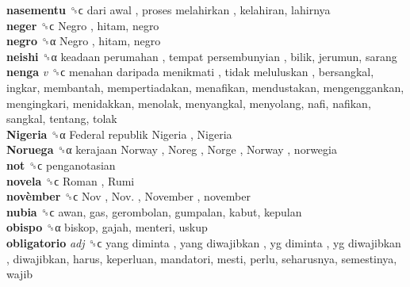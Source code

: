 \textbf{nasementu} ␝ϲ   dari awal ,  proses melahirkan , kelahiran, lahirnya  \\
\textbf{neger} ␝ϲ   Negro , hitam, negro  \\
\textbf{negro} ␝α   Negro , hitam, negro  \\
\textbf{neishi} ␝α   keadaan perumahan ,  tempat persembunyian , bilik, jerumun, sarang  \\
\textbf{nenga} \emph{v}  ␝ϲ   menahan daripada menikmati ,  tidak meluluskan , bersangkal, ingkar, membantah, mempertiadakan, menafikan, mendustakan, mengenggankan, mengingkari, menidakkan, menolak, menyangkal, menyolang, nafi, nafikan, sangkal, tentang, tolak  \\
\textbf{Nigeria} ␝α   Federal republik Nigeria ,  Nigeria   \\
\textbf{Noruega} ␝α   kerajaan Norway ,  Noreg ,  Norge ,  Norway , norwegia  \\
\textbf{not} ␝ϲ  penganotasian  \\
\textbf{novela} ␝ϲ   Roman ,  Rumi   \\
\textbf{novèmber} ␝ϲ   Nov ,  Nov. ,  November , november  \\
\textbf{nubia} ␝ϲ  awan, gas, gerombolan, gumpalan, kabut, kepulan  \\
\textbf{obispo} ␝α  biskop, gajah, menteri, uskup  \\
\textbf{obligatorio} \emph{adj}  ␝ϲ   yang diminta ,  yang diwajibkan ,  yg diminta ,  yg diwajibkan , diwajibkan, harus, keperluan, mandatori, mesti, perlu, seharusnya, semestinya, wajib  \\
